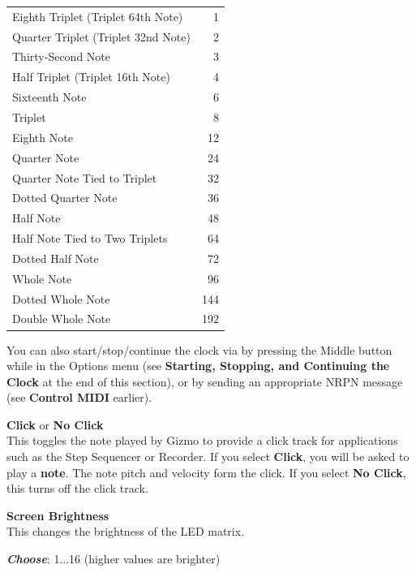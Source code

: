 \documentclass{article}
\begin{document}
\begin{description}
\begin{center}
\begin{tabular}{@{}lr@{}}
Eighth Triplet (Triplet 64th Note)	&1\\
Quarter Triplet (Triplet 32nd Note)	&2\\
Thirty-Second Note				&3\\
Half Triplet (Triplet 16th Note)		&4\\
Sixteenth Note					&6\\
Triplet						&8\\
Eighth Note					&12\\
Quarter Note					&24\\
Quarter Note Tied to Triplet		&32\\
Dotted Quarter Note				&36\\
Half Note						&48\\
Half Note Tied to Two Triplets		&64\\
Dotted Half Note				&72\\
Whole Note					&96\\
Dotted Whole Note				&144\\
Double Whole Note				&192\\
\end{tabular}\end{center}

		You can also start/stop/continue the clock via by pressing the Middle button while in the Options menu (see {\bf Starting, Stopping, and Continuing the Clock} at the end of this section), or by sending an appropriate NRPN message (see {\bf Control MIDI} earlier).
		
	\item{\bf Click} or {\bf No Click}\\
		This toggles the note played by Gizmo to provide a click track for applications such as the Step Sequencer or Recorder.  If you select {\bf Click}, you will be asked to play a {\bf note}.  The note pitch and velocity form the click.  If you select {\bf No Click}, this turns off the click track.
		
\hspace{\fill}\vspace{-1.5em}

	\item{\bf Screen Brightness}\\
		This changes the brightness of the LED matrix.
		\begin{description}
		\item{\bf \textit{Choose}}: 1...16 (higher values are brighter)
		\end{description}
		

\end{description}
\end{document}
